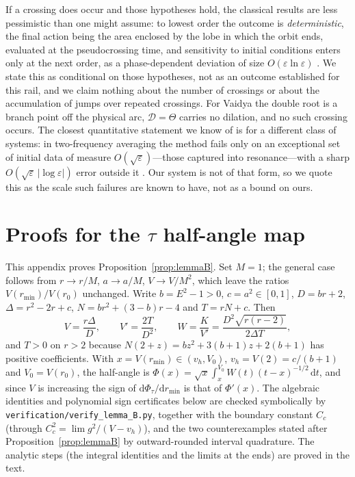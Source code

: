 \documentclass[12pt]{iopart}
\theoremstyle{plain}
\theoremstyle{definition}
\theoremstyle{remark}
\newcommand{\dd}{\mathrm{d}}
\begin{document}
If a crossing does occur and those hypotheses hold, the classical results are less
pessimistic than one might assume: to lowest order the outcome is \emph{deterministic},
the final action being the area enclosed by the lobe in which the orbit ends, evaluated
at the pseudocrossing time, and sensitivity to initial conditions enters only at the
next order, as a phase-dependent deviation of size $O(\varepsilon\ln\varepsilon)$
\cite{CaryEscandeTennyson1986}. We state this as conditional on those hypotheses, not as
an outcome established for this rail, and we claim nothing about the number of crossings
or about the accumulation of jumps over repeated crossings. For Vaidya the double
root is a branch point off the physical arc, $\mathcal D=\Theta$ carries no dilation,
and no such crossing occurs.
The closest quantitative statement we know of is for a different class of
systems: in two-frequency averaging the method fails only on an exceptional set
of initial data of measure $O(\sqrt\varepsilon)$---those captured into
resonance---with a sharp $O(\sqrt\varepsilon\,|\!\log\varepsilon|)$ error outside
it \cite{Neishtadt2013}. Our system is not of that form, so we quote this as the
scale such failures are known to have, not as a bound on ours.



\section{Proofs for the $\tau$ half-angle map}
\label{app:lemmaB}

This appendix proves Proposition~\ref{prop:lemmaB}. Set $M=1$; the general case follows
from $r\to r/M$, $a\to a/M$, $V\to V/M^2$, which leave the ratios $V(r_{\min})/V(r_0)$
unchanged. Write $b=E^2-1>0$, $c=a^2\in[0,1]$, $D=br+2$, $\Delta=r^2-2r+c$,
$N=br^2+(3-b)r-4$ and $T=rN+c$. Then
\[
    V=\frac{r\Delta}{D},\qquad V'=\frac{2T}{D^2},\qquad
    W=\frac{K}{V'}=\frac{D^2\sqrt{r(r-2)}}{2\Delta T},
\]
and $T>0$ on $r>2$ because $N(2+z)=bz^2+3(b+1)z+2(b+1)$ has positive coefficients. With
$x=V(r_{\min})\in(v_h,V_0)$, $v_h=V(2)=c/(b+1)$ and $V_0=V(r_0)$, the half-angle is
$\Phi(x)=\sqrt x\int_x^{V_0}W(t)(t-x)^{-1/2}\,\dd t$, and since $V$ is increasing the sign
of $\dd\Phi_\tau/\dd r_{\min}$ is that of $\Phi'(x)$. The algebraic identities and
polynomial sign certificates below are checked symbolically by
\texttt{verification/verify\_lemma\_B.py}, together with the boundary constant $C_c$
(through $C_c^2=\lim g^2/(V-v_h)$), and the two counterexamples stated after
Proposition~\ref{prop:lemmaB} by outward-rounded interval quadrature. The analytic steps
(the integral identities and the limits at the ends) are proved in the text.
\end{document}
